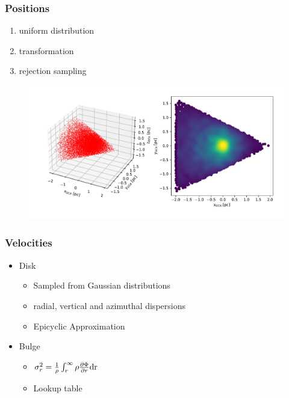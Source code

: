 \documentclass{beamer}
\begin{document}
\begin{frame}
\frametitle{Positions}

\begin{enumerate}
\item uniform distribution
\item transformation
\item rejection sampling
\end{enumerate}

\begin{figure}
\centering
\includegraphics[width=\linewidth]{Images/cone_3D.pdf}
\end{figure}

\end{frame}


\begin{frame}
\frametitle{Velocities}

\begin{itemize}
\item Disk
	\begin{itemize}
	\item Sampled from Gaussian distributions
	\item radial, vertical and azimuthal dispersions
	\item Epicyclic Approximation
	\end{itemize}
\item Bulge
	\begin{itemize}
	\item \(\sigma_r^2 = \frac{1}{\rho}\int_{r}^{\infty}\rho \frac{\partial \Phi}{\partial r}\textup{dr}\)
	\item Lookup table
	\end{itemize}
\end{itemize}

\end{frame}
\end{document}
